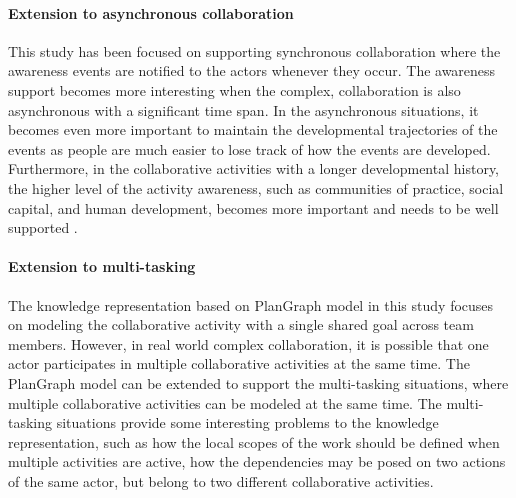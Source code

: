 \paragraph*{Extension to asynchronous collaboration} %
\label{par:extension_to_asynchronous_collaboration}
This study has been focused on supporting synchronous collaboration where the awareness events are notified to the actors whenever they occur. The awareness support becomes more interesting when the complex, collaboration is also asynchronous with a significant time span. In the asynchronous situations, it becomes even more important to maintain the developmental trajectories of the events as people are much easier to lose track of how the events are developed. Furthermore, in the collaborative activities with a longer developmental history, the higher level of the activity awareness, such as communities of practice, social capital, and human development, becomes more important and needs to be well supported \cite{carroll2006a}.

\paragraph*{Extension to multi-tasking} %
\label{par:extension_to_multi_tasking}
The knowledge representation based on PlanGraph model in this study focuses on modeling the collaborative activity with a single shared goal across team members. However, in real world complex collaboration, it is possible that one actor participates in multiple collaborative activities at the same time. The PlanGraph model can be extended to support the multi-tasking situations, where multiple collaborative activities can be modeled at the same time. The multi-tasking situations provide some interesting problems to the knowledge representation, such as how the local scopes of the work should be defined when multiple activities are active, how the dependencies may be posed on two actions of the same actor, but belong to two different collaborative activities.
